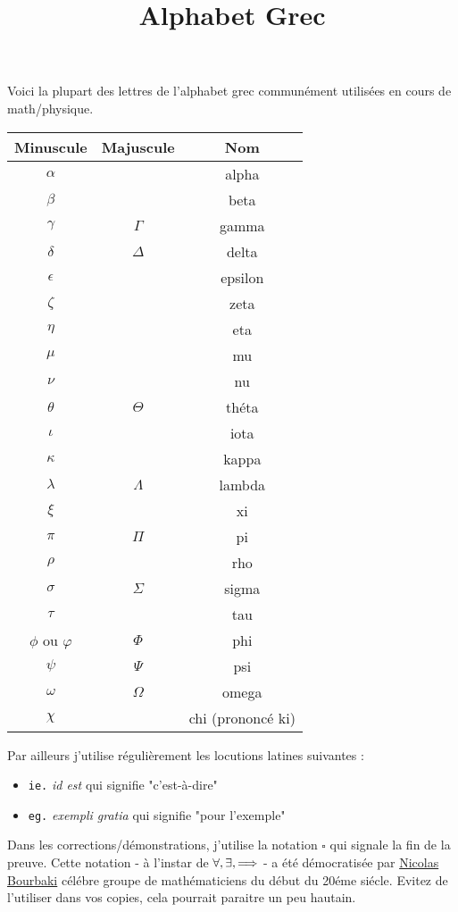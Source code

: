 \documentclass[a4paper, 11pt]{article}
\begin{document}
\title{Alphabet Grec}




Voici la plupart des lettres de l'alphabet grec communément utilisées en cours de math/physique.
\begin{center}
\begin{tabular}{|c|c|c|}

\hline
Minuscule  & Majuscule & Nom\\
\hline
$\alpha$ &  & alpha  \\
\hline
$\beta $ &  & beta  \\
\hline
$\gamma $ &$ \Gamma $& gamma  \\
\hline
$\delta$  & $\Delta $& delta \\
\hline
$\epsilon $& & epsilon \\
\hline
$\zeta$ & & zeta \\
\hline
$\eta$ & & eta \\
\hline

$\mu$ & & mu \\
\hline
$\nu$ & & nu \\
\hline
$\theta $&$ \Theta $& théta\\
\hline
$\iota$ & & iota\\
\hline
$\kappa $& & kappa\\
\hline
$\lambda $&$ \Lambda $& lambda \\
\hline
$\xi$  & & xi \\
\hline
$\pi$ & $\Pi$ & pi \\
\hline
$\rho $& & rho\\
\hline
$\sigma $& $\Sigma $& sigma \\
\hline
$\tau$ & & tau \\
\hline
$\phi$  ou $\varphi$ & $\Phi$ & phi \\
\hline
$\psi$  &$ \Psi$ & psi  \\
\hline
$\omega$ & $\Omega$ & omega \\
\hline
$\chi$ &  & chi (prononcé ki) \\
\hline
\end{tabular}

\end{center}

Par ailleurs j'utilise régulièrement les locutions latines suivantes :
\begin{itemize}
    \item \texttt{ie.} \textit{id est} qui signifie "c'est-à-dire"
    \item \texttt{eg.} \textit{exempli gratia} qui signifie "pour l'exemple"
 \end{itemize}

Dans les corrections/démonstrations, j'utilise la notation $\square$ qui signale la fin de la preuve. Cette notation - à l'instar de $\forall, \exists, \Longrightarrow$ -  a été démocratisée par \href{https://fr.wikipedia.org/wiki/Nicolas_Bourbaki}{Nicolas Bourbaki} célébre groupe de mathématiciens du début du 20éme siécle. Evitez de l'utiliser dans vos copies, cela pourrait paraitre un peu hautain. 
\end{document}
